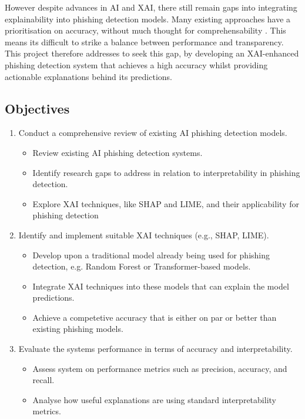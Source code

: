 \noindent However despite advances in AI and XAI, there still remain gaps into integrating explainability into phishing detection models. Many existing approaches have a prioritisation on accuracy, without much thought for comprehensability \citep{hernandes2021phishing}. This means its difficult to strike a balance between performance and transparency. This project therefore addresses to seek this gap, by developing an XAI-enhanced phishing detection system that achieves a high accuracy whilst providing actionable explanations behind its predictions.

\subsection*{Objectives}
\begin{enumerate}
    \item Conduct a comprehensive review of existing AI phishing detection models.
        \begin{itemize}
            \item Review existing AI phishing detection systems.
            \item Identify research gaps to address in relation to interpretability in phishing detection.
            \item Explore XAI techniques, like SHAP and LIME, and their applicability for phishing detection
        \end{itemize}
    \item Identify and implement suitable XAI techniques (e.g., SHAP, LIME).
        \begin{itemize}
            \item Develop upon a traditional model already being used for phishing detection, e.g. Random Forest or Transformer-based models.
            \item Integrate XAI techniques into these models that can explain the model predictions.
            \item Achieve a competetive accuracy that is either on par or better than existing phishing models.
        \end{itemize}
    \item Evaluate the system\textquotesingle s performance in terms of accuracy and interpretability.
        \begin{itemize}
            \item Assess system on performance metrics such as precision, accuracy, and recall.
            \item Analyse how useful explanations are using standard interpretability metrics.

\end{itemize}
\end{enumerate}
